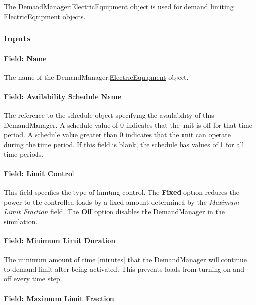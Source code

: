The DemandManager:\hyperref[electricequipment]{ElectricEquipment} object is used for demand limiting \hyperref[electricequipment]{ElectricEquipment} objects.

\subsubsection{Inputs}\label{inputs-3-008}

\paragraph{Field: Name}\label{field-name-3-008}

The name of the DemandManager:\hyperref[electricequipment]{ElectricEquipment} object.

\paragraph{Field: Availability Schedule Name}\label{field-availability-schedule-name-2-000}

The reference to the schedule object specifying the availability of this DemandManager. A schedule value of 0 indicates that the unit is off for that time period. A schedule value greater than 0 indicates that the unit can operate during the time period. If this field is blank, the schedule has values of 1 for all time periods.

\paragraph{Field: Limit Control}\label{field-limit-control-2}

This field specifies the type of limiting control. The \textbf{Fixed} option reduces the power to the controlled loads by a fixed amount determined by the \emph{Maximum Limit Fraction} field. The \textbf{Off} option disables the DemandManager in the simulation.

\paragraph{Field: Minimum Limit Duration}\label{field-minimum-limit-duration-2}

The minimum amount of time {[}minutes{]} that the DemandManager will continue to demand limit after being activated. This prevents loads from turning on and off every time step.

\paragraph{Field: Maximum Limit Fraction}\label{field-maximum-limit-fraction-2}

